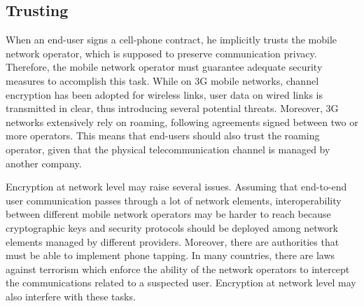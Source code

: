 \documentclass[10pt, conference, compsocconf]{IEEEtran}
\begin{document}
\subsection{Trusting}

When an end-user signs a cell-phone contract, he implicitly trusts the mobile network operator, which is supposed to preserve communication privacy. Therefore, the mobile network operator must guarantee adequate security measures to accomplish this task. While on 3G mobile networks, channel encryption has been adopted for wireless links, user data on wired links is transmitted in clear, thus introducing several potential threats. Moreover, 3G networks extensively rely on roaming, following agreements signed between two or more operators. This means that end-users should also trust the roaming operator, given that the physical telecommunication channel is managed by another company.



Encryption at network level may raise several issues. Assuming that end-to-end user communication passes through a lot of network elements, interoperability between different mobile network operators may be harder to reach because cryptographic keys and security protocols should be deployed among network elements managed by different providers. Moreover, there are authorities that must be able to implement phone tapping. In many countries, there are laws against terrorism which enforce the ability of the network operators to intercept the communications related to a suspected user. Encryption at network level may also interfere with these tasks.
\end{document}
